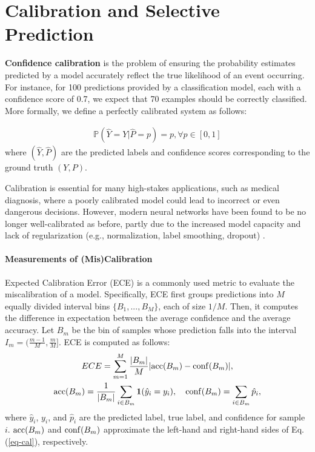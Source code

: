 \section{Calibration and Selective Prediction}
\textbf{Confidence calibration} is the problem of ensuring the probability estimates predicted by a model accurately reflect the true likelihood of an event occurring. For instance, for 100 predictions provided by a classification model, each with a confidence score of 0.7, we expect that 70 examples should be correctly classified. More formally, we define a perfectly calibrated system as follows:

\begin{gather} \label{eq-cal}
\mathbb{P}(\hat{Y}=Y|\hat{P}=p)=p, \forall p \in [0, 1] 
\end{gather}
where $(\hat{Y}, \hat{P})$ are the predicted labels and confidence scores corresponding to the ground truth $(Y, P)$.

Calibration is essential for many high-stakes applications, such as medical diagnosis, where a poorly calibrated model could lead to incorrect or even dangerous decisions.
However, modern neural networks have been found to be no longer well-calibrated as before, partly due to the increased model capacity and lack of regularization (e.g., normalization, label smoothing, dropout) \citep{guo2017calibration}. 


\paragraph{Measurements of (Mis)Calibration} Expected Calibration Error (ECE) is a commonly used metric to evaluate the miscalibration of a model.
Specifically, ECE first groups predictions into $M$ equally divided interval bins $\{B_{1}, ..., B_{M}\}$, each of size $1/M$. Then, it computes the difference in expectation between the average confidence and the average accuracy. 
Let $B_{m}$ be the bin of samples whose prediction falls into the interval $I_{m} = (\frac{m-1}{M}, \frac{m}{M}]$. ECE is computed as follows:
\begin{gather}
    ECE = \sum_{m=1}^{M} \frac{|B_{m}|}{M}|{\rm acc}(B_{m})-{\rm conf}(B_{m})|, \\
    {\rm acc}(B_{m}) = \frac{1}{|B_{m}|} \sum_{i\in B_{m}}\mathbf{1}(\hat{y}_{i}=y_{i}), \quad
    {\rm conf}(B_{m}) = \sum_{i \in B_{m}} \hat{p}_{i},
\end{gather}
where $\hat{y}_{i}$, $y_{i}$, and $\hat{p}_{i}$ are the predicted label, true label, and confidence for sample $i$. ${\rm acc}(B_{m})$ and ${\rm conf}(B_{m})$ approximate the left-hand and right-hand sides of Eq.(\ref{eq-cal}), respectively. 

